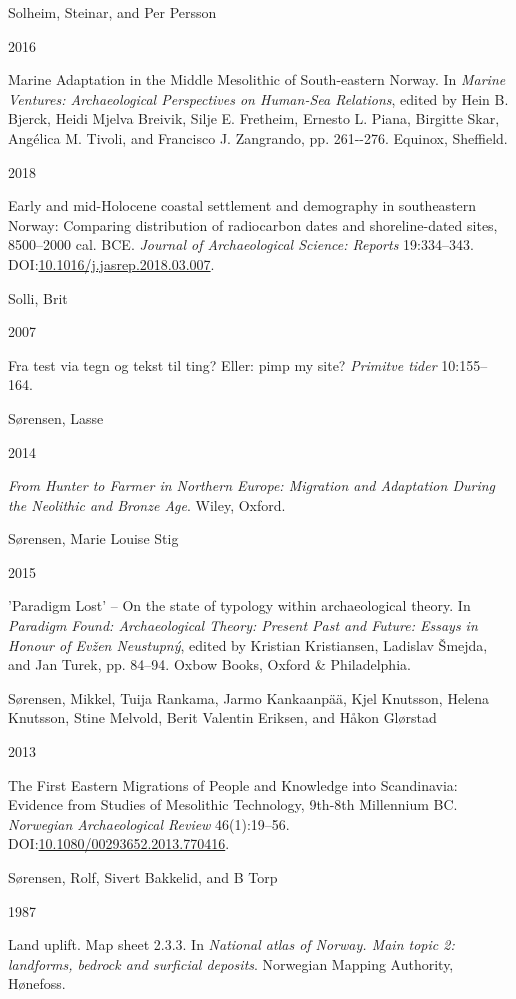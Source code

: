 \documentclass[
  12pt,
  a4paper,
  oneside]{book}
\newlength{\cslhangindent}
\newlength{\csllabelwidth}
\newlength{\cslentryspacingunit} %
\newenvironment{CSLReferences}[2] %
 {%
  \setlength{\parindent}{0pt}
  \ifodd #1
  \let\oldpar\par
  \def\par{\hangindent=\cslhangindent\oldpar}
  \fi
  \setlength{\parskip}{#2\cslentryspacingunit}
 }%
 {}
\newcommand{\CSLBlock}[1]{#1\hfill\break}
\newcommand{\CSLLeftMargin}[1]{\parbox[t]{\csllabelwidth}{#1}}
\newcommand{\CSLRightInline}[1]{\parbox[t]{\linewidth - \csllabelwidth}{#1}\break}
\begin{document}
\begin{CSLReferences}{0}{0}
\leavevmode{}%
\CSLBlock{Solheim, Steinar, and Per Persson}
\CSLLeftMargin{ 2016}%
\CSLRightInline{{Marine Adaptation in the Middle Mesolithic of South-eastern Norway}. In \emph{{Marine Ventures: Archaeological Perspectives on Human-Sea Relations}}, edited by Hein B. Bjerck, Heidi Mjelva Breivik, Silje E. Fretheim, Ernesto L. Piana, Birgitte Skar, Angélica M. Tivoli, and Francisco J. Zangrando, pp. 261-\/-276. Equinox, Sheffield.}

\leavevmode{}%
\CSLLeftMargin{ 2018 }%
\CSLRightInline{Early and mid-Holocene coastal settlement and demography in southeastern Norway: Comparing distribution of radiocarbon dates and shoreline-dated sites, 8500--2000 cal. BCE. \emph{Journal of Archaeological Science: Reports} 19:334--343. DOI:\href{https://doi.org/10.1016/j.jasrep.2018.03.007}{10.1016/j.jasrep.2018.03.007}.}

\leavevmode{}%
\CSLBlock{Solli, Brit}
\CSLLeftMargin{ 2007}%
\CSLRightInline{{Fra test via tegn og tekst til ting? Eller: pimp my site?} \emph{Primitve tider} 10:155--164.}

\leavevmode{}%
\CSLBlock{Sørensen, Lasse}
\CSLLeftMargin{ 2014}%
\CSLRightInline{\emph{{From Hunter to Farmer in Northern Europe: Migration and Adaptation During the Neolithic and Bronze Age}}. Wiley, Oxford.}

\leavevmode{}%
\CSLBlock{Sørensen, Marie Louise Stig}
\CSLLeftMargin{ 2015}%
\CSLRightInline{{'Paradigm Lost' -- On the state of typology within archaeological theory}. In \emph{{Paradigm Found: Archaeological Theory: Present Past and Future: Essays in Honour of Evžen Neustupný}}, edited by Kristian Kristiansen, Ladislav Šmejda, and Jan Turek, pp. 84--94. Oxbow Books, Oxford \& Philadelphia.}

\leavevmode{}%
\CSLBlock{Sørensen, Mikkel, Tuija Rankama, Jarmo Kankaanpää, Kjel Knutsson, Helena Knutsson, Stine Melvold, Berit Valentin Eriksen, and Håkon Glørstad}
\CSLLeftMargin{ 2013}%
\CSLRightInline{{The First Eastern Migrations of People and Knowledge into Scandinavia: Evidence from Studies of Mesolithic Technology, 9th-8th Millennium BC}. \emph{Norwegian Archaeological Review} 46(1):19--56. DOI:\href{https://doi.org/10.1080/00293652.2013.770416}{10.1080/00293652.2013.770416}.}

\leavevmode{}%
\CSLBlock{Sørensen, Rolf, Sivert Bakkelid, and B Torp}
\CSLLeftMargin{ 1987}%
\CSLRightInline{{Land uplift. Map sheet 2.3.3}. In \emph{{National atlas of Norway. Main topic 2: landforms, bedrock and surficial deposits}}. Norwegian Mapping Authority, Hønefoss.}


\end{CSLReferences}
\end{document}
